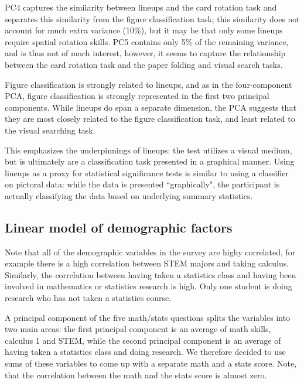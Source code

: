 \documentclass[11pt]{isuthesis}\usepackage[]{graphicx}\usepackage[]{color}
\begin{document}
PC4 captures the similarity between lineups and the card rotation task and separates this similarity from the figure classification task; this similarity does not account for much extra variance (10\%), but it may be that only some lineups require spatial rotation skills. PC5 contains only 5\% of the remaining variance, and is thus not of much interest, however, it seems to capture the relationship between the card rotation task and the paper folding and visual search tasks.


Figure classification is strongly related to lineups, and as in the four-component PCA, figure classification is strongly represented in the first two principal components. While lineups do span a separate dimension, the PCA suggests that they are most closely related to the figure classification task, and least related to the visual searching task.

% 
% 

This emphasizes the underpinnings of lineups: the test utilizes a visual medium, but is ultimately are a classification task presented in a graphical manner. Using lineups as a proxy for statistical significance tests is similar to using a classifier on pictoral data: while the data is presented ``graphically", the participant is actually classifying the data based on underlying summary statistics.


\subsection{Linear model of demographic factors}
Note that all of the demographic variables in the survey are highy correlated, for example there is a high correlation between STEM majors and taking calculus.
Similarly, the correlation  between having taken a statistics class and having been involved in mathematics or statistics research is high. Only one student is doing research who has not taken a statistics course. 

A principal component of the five math/stats questions splits the variables into two main areas: the first principal component is an average of math skills, calculus 1 and STEM, while the second principal component is an average of having taken a statistics class and doing research. We therefore decided to use sums of these variables to come up with a separate math and a stats score. Note, that the correlation between the math and the stats score is almost zero. 
\end{document}
